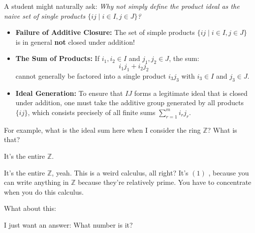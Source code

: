 \begin{content}

\begin{steps}
A student might naturally ask: \emph{Why not simply define the product ideal as the naive set of single products $\{ i j \mid i \in I, j \in J \}$?}
\begin{itemize}
    \item \textbf{Failure of Additive Closure:} The set of simple products $\{ i j \mid i \in I, j \in J \}$ is in general \textbf{not} closed under addition!
    \item \textbf{The Sum of Products:} If $i_1, i_2 \in I$ and $j_1, j_2 \in J$, the sum:
    \[
    i_1 j_1 + i_2 j_2
    \]
    cannot generally be factored into a single product $i_3 j_3$ with $i_3 \in I$ and $j_3 \in J$.
    \item \textbf{Ideal Generation:} To ensure that $IJ$ forms a legitimate ideal that is closed under addition, one must take the additive group generated by all products $\{ij\}$, which consists precisely of all finite sums $\sum_{r=1}^m i_r j_r$.
\end{itemize}
\end{steps}
\end{content}

\begin{speech}[01:14:12 - 01:14:51]
For example, what is the ideal sum here when I consider the ring $\mathbb{Z}$?  What is that?
\end{speech}

\begin{student}
It's the entire $\mathbb{Z}$.
\end{student}

\begin{speech}[01:14:52 - 01:15:31]
It's the entire $\mathbb{Z}$, yeah. This is a weird calculus, all right? It's $(1)$ , because you can write anything in $\mathbb{Z}$ because they're relatively prime. You have to concentrate when you do this calculus.

What about this: 

I just want an answer: What number is it? 
\end{speech}

